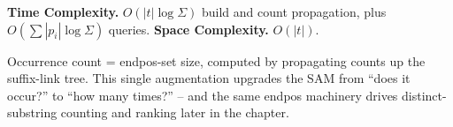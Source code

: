 \begin{complexitybox}
\textbf{Time Complexity.} $O(|t|\log\Sigma)$ build and count propagation,
plus $O(\sum|p_i|\log\Sigma)$ queries. \textbf{Space Complexity.}
$O(|t|)$.
\end{complexitybox}

\begin{takeawaybox}
Occurrence count = endpos-set size, computed by propagating counts up the
suffix-link tree. This single augmentation upgrades the SAM from ``does it
occur?'' to ``how many times?'' -- and the same endpos machinery drives
distinct-substring counting and ranking later in the chapter.
\end{takeawaybox}
